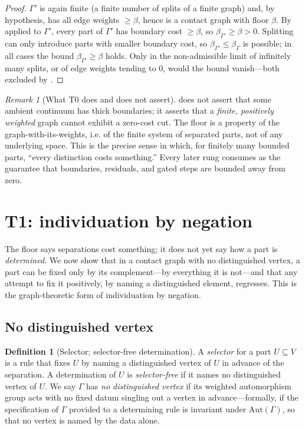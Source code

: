 \documentclass[11pt,a4paper]{article}
\theoremstyle{thmstyle}
\theoremstyle{definition}
\newtheorem{definition}[theorem]{Definition}
\theoremstyle{remark}
\newtheorem{remark}[theorem]{Remark}
\newcommand{\Gph}{\Gamma}                 %
\newcommand{\V}{V}                        %
\newcommand{\floorc}{\beta}               %
\begin{document}
\begin{proof}
$\Gph'$ is again finite (a finite number of splits of a finite graph) and, by
hypothesis, has all edge weights $\ge\floorc$, hence is a contact graph with
floor $\floorc$. By  applied to $\Gph'$, every part of $\Gph'$
has boundary cost $\ge\floorc$, so $\floorc_{\Gph'}\ge\floorc>0$. Splitting can
only introduce parts with smaller boundary cost, so $\floorc_{\Gph'}\le
\floorc_\Gph$ is possible; in all cases the bound $\floorc_{\Gph'}\ge\floorc$
holds. Only in the non-admissible limit of infinitely many splits, or of edge
weights tending to $0$, would the bound vanish---both excluded by
.
\end{proof}

\begin{remark}[What T0 does and does not assert]
\label{rem:floor-scope}
 does not assert that some ambient continuum has thick
boundaries; it asserts that a \emph{finite, positively weighted} graph cannot
exhibit a zero-cost cut. The floor is a property of the graph-with-its-weights,
i.e. of the finite system of separated parts, not of any underlying space. This
is the precise sense in which, for finitely many bounded parts, ``every
distinction costs something.'' Every later rung consumes  as the
guarantee that boundaries, residuals, and gated steps are bounded away from
zero.
\end{remark}


\section{T1: individuation by negation}
\label{sec:negation}

The floor says separations cost something; it does not yet say how a part is
\emph{determined}. We now show that in a contact graph with no distinguished
vertex, a part can be fixed only by its complement---by everything it is
not---and that any attempt to fix it positively, by naming a distinguished
element, regresses. This is the graph-theoretic form of individuation by
negation.

\subsection{No distinguished vertex}

\begin{definition}[Selector; selector-free determination]
\label{def:selector}
A \emph{selector} for a part $U\subseteq\V$ is a rule that fixes $U$ by naming a
distinguished vertex of $U$ in advance of the separation. A determination of $U$
is \emph{selector-free} if it names no distinguished vertex of $U$. We say
$\Gph$ has \emph{no distinguished vertex} if its weighted automorphism group
acts with no fixed datum singling out a vertex in advance---formally, if the
specification of $\Gph$ provided to a determining rule is invariant under
$\mathrm{Aut}(\Gph)$, so that no vertex is named by the data alone.
\end{definition}
\end{document}
